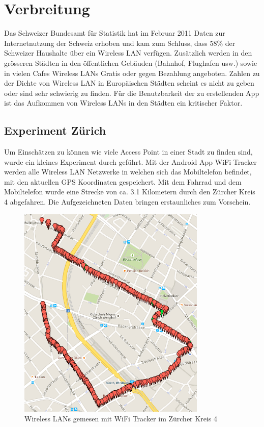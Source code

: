 \section{Verbreitung}
Das Schweizer Bundesamt für Statistik hat im Februar 2011 Daten zur Internetnutzung der Schweiz erhoben und kam zum Schluss, dass 58\% der Schweizer Haushalte über ein Wireless LAN verfügen\citep[S. 8]{bfs.internet.2011}. Zusätzlich werden in den grösseren Städten in den öffentlichen Gebäuden (Bahnhof, Flughafen usw.) sowie in vielen Cafes Wireless LANs Gratis oder gegen Bezahlung angeboten. Zahlen zu der Dichte von Wireless LAN in Europäischen Städten scheint es nicht zu geben oder sind sehr schwierig zu finden. Für die Benutzbarkeit der zu erstellenden App ist das Aufkommen von Wireless LANs in den Städten ein kritischer Faktor.

\subsection{Experiment Zürich}
Um Einschätzen zu können wie viele Access Point in einer Stadt zu finden sind, wurde ein kleines Experiment durch geführt. Mit der Android App WiFi Tracker\citep{google.play.wifitracker} werden alle Wireless LAN Netzwerke in welchen sich das Mobiltelefon befindet, mit den aktuellen GPS Koordinaten gespeichert. Mit dem Fahrrad und dem Mobiltelefon wurde eine Strecke von ca. 3.1 Kilometern durch den Zürcher Kreis 4 abgefahren. Die Aufgezeichneten Daten bringen erstaunliches zum Vorschein.
\begin{figure}[ht]
	\centering
	\includegraphics[width=0.8\textwidth]{images/wifikreis4.png}
	\caption{Wireless LANs gemesen mit WiFi Tracker im Zürcher Kreis 4}
	\label{fig:wifikreis4}
\end{figure}
